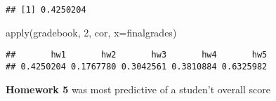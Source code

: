 \documentclass[
]{article}
\newenvironment{Shaded}{\begin{snugshade}}{\end{snugshade}}
\newcommand{\AttributeTok}[1]{\textcolor[rgb]{0.77,0.63,0.00}{#1}}
\newcommand{\DecValTok}[1]{\textcolor[rgb]{0.00,0.00,0.81}{#1}}
\newcommand{\FunctionTok}[1]{\textcolor[rgb]{0.00,0.00,0.00}{#1}}
\newcommand{\NormalTok}[1]{#1}
\begin{document}
\begin{verbatim}
## [1] 0.4250204
\end{verbatim}

\begin{Shaded}
\begin{Highlighting}[]
\FunctionTok{apply}\NormalTok{(gradebook, }\DecValTok{2}\NormalTok{, cor, }\AttributeTok{x=}\NormalTok{finalgrades)}
\end{Highlighting}
\end{Shaded}

\begin{verbatim}
##       hw1       hw2       hw3       hw4       hw5 
## 0.4250204 0.1767780 0.3042561 0.3810884 0.6325982
\end{verbatim}

\textbf{Homework 5} was most predictive of a studen't overall score
\end{document}
